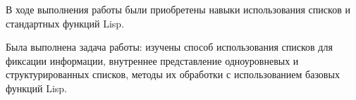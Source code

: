 
В ходе выполнения работы были приобретены навыки использования списков и стандартных функций Lisp.

Была выполнена задача работы: изучены способ использования списков для фиксации
информации, внутреннее представление одноуровневых и
структурированных списков, методы их обработки с использованием базовых функций Lisp.

